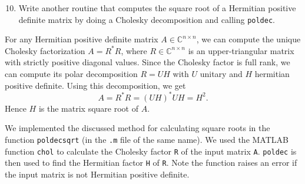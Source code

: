 \documentclass[10pt, A4paper]{article}
\newcommand{\nxn}{n \times n}
\begin{document}
\vspace{0.2cm}
\begin{enumerate}
	\setcounter{enumi}{9}
	\item Write another routine that computes the square root of a 
	Hermitian positive definite matrix by doing a Cholesky 
	decomposition and calling \texttt{poldec}.
\end{enumerate}

For any Hermitian positive definite matrix $A \in \mathbb{C}^{\nxn}$, 
we can compute the unique Cholesky factorization $A = R^*R$, where $R 
\in \mathbb{C}^{\nxn}$ is an upper-triangular matrix with strictly 
positive diagonal values.
Since the Cholesky factor is full rank, we can compute its polar 
decomposition $R = UH$ with $U$ unitary and $H$ hermitian positive 
definite.
Using this decomposition, we get $$A = R^*R = (UH)^*UH = H^2.$$
Hence $H$ is the matrix square root of $A$.

We implemented the discussed method for calculating square roots in the 
function \texttt{poldecsqrt} (in the \texttt{.m} file of the same name).
We used the MATLAB function \texttt{chol} to calculate the Cholesky 
factor \texttt{R} of the input matrix \texttt{A}.
\texttt{poldec} is then used to find the Hermitian factor \texttt{H} of 
\texttt{R}. Note the function raises an error if the input matrix is 
not Hermitian positive definite.




\end{document}
